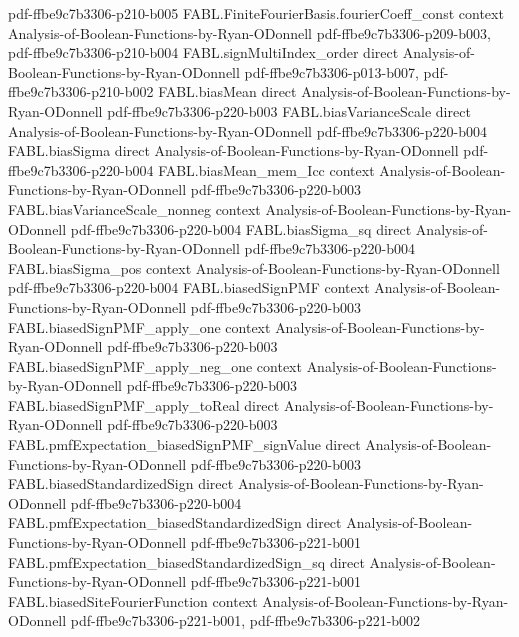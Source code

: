 \begin{theorem}
{    pdf-ffbe9c7b3306-p210-b005}
\proofstep
  {FABL.FiniteFourierBasis.fourierCoeff_const}
  {context}
  {Analysis-of-Boolean-Functions-by-Ryan-ODonnell}
  {pdf-ffbe9c7b3306-p209-b003,
    pdf-ffbe9c7b3306-p210-b004}
\proofstep
  {FABL.signMultiIndex_order}
  {direct}
  {Analysis-of-Boolean-Functions-by-Ryan-ODonnell}
  {pdf-ffbe9c7b3306-p013-b007,
    pdf-ffbe9c7b3306-p210-b002}
\proofstep
  {FABL.biasMean}
  {direct}
  {Analysis-of-Boolean-Functions-by-Ryan-ODonnell}
  {pdf-ffbe9c7b3306-p220-b003}
\proofstep
  {FABL.biasVarianceScale}
  {direct}
  {Analysis-of-Boolean-Functions-by-Ryan-ODonnell}
  {pdf-ffbe9c7b3306-p220-b004}
\proofstep
  {FABL.biasSigma}
  {direct}
  {Analysis-of-Boolean-Functions-by-Ryan-ODonnell}
  {pdf-ffbe9c7b3306-p220-b004}
\proofstep
  {FABL.biasMean_mem_Icc}
  {context}
  {Analysis-of-Boolean-Functions-by-Ryan-ODonnell}
  {pdf-ffbe9c7b3306-p220-b003}
\proofstep
  {FABL.biasVarianceScale_nonneg}
  {context}
  {Analysis-of-Boolean-Functions-by-Ryan-ODonnell}
  {pdf-ffbe9c7b3306-p220-b004}
\proofstep
  {FABL.biasSigma_sq}
  {direct}
  {Analysis-of-Boolean-Functions-by-Ryan-ODonnell}
  {pdf-ffbe9c7b3306-p220-b004}
\proofstep
  {FABL.biasSigma_pos}
  {context}
  {Analysis-of-Boolean-Functions-by-Ryan-ODonnell}
  {pdf-ffbe9c7b3306-p220-b004}
\proofstep
  {FABL.biasedSignPMF}
  {context}
  {Analysis-of-Boolean-Functions-by-Ryan-ODonnell}
  {pdf-ffbe9c7b3306-p220-b003}
\proofstep
  {FABL.biasedSignPMF_apply_one}
  {context}
  {Analysis-of-Boolean-Functions-by-Ryan-ODonnell}
  {pdf-ffbe9c7b3306-p220-b003}
\proofstep
  {FABL.biasedSignPMF_apply_neg_one}
  {context}
  {Analysis-of-Boolean-Functions-by-Ryan-ODonnell}
  {pdf-ffbe9c7b3306-p220-b003}
\proofstep
  {FABL.biasedSignPMF_apply_toReal}
  {direct}
  {Analysis-of-Boolean-Functions-by-Ryan-ODonnell}
  {pdf-ffbe9c7b3306-p220-b003}
\proofstep
  {FABL.pmfExpectation_biasedSignPMF_signValue}
  {direct}
  {Analysis-of-Boolean-Functions-by-Ryan-ODonnell}
  {pdf-ffbe9c7b3306-p220-b003}
\proofstep
  {FABL.biasedStandardizedSign}
  {direct}
  {Analysis-of-Boolean-Functions-by-Ryan-ODonnell}
  {pdf-ffbe9c7b3306-p220-b004}
\proofstep
  {FABL.pmfExpectation_biasedStandardizedSign}
  {direct}
  {Analysis-of-Boolean-Functions-by-Ryan-ODonnell}
  {pdf-ffbe9c7b3306-p221-b001}
\proofstep
  {FABL.pmfExpectation_biasedStandardizedSign_sq}
  {direct}
  {Analysis-of-Boolean-Functions-by-Ryan-ODonnell}
  {pdf-ffbe9c7b3306-p221-b001}
\proofstep
  {FABL.biasedSiteFourierFunction}
  {context}
  {Analysis-of-Boolean-Functions-by-Ryan-ODonnell}
  {pdf-ffbe9c7b3306-p221-b001,
    pdf-ffbe9c7b3306-p221-b002}
\proofstep

\end{theorem}
